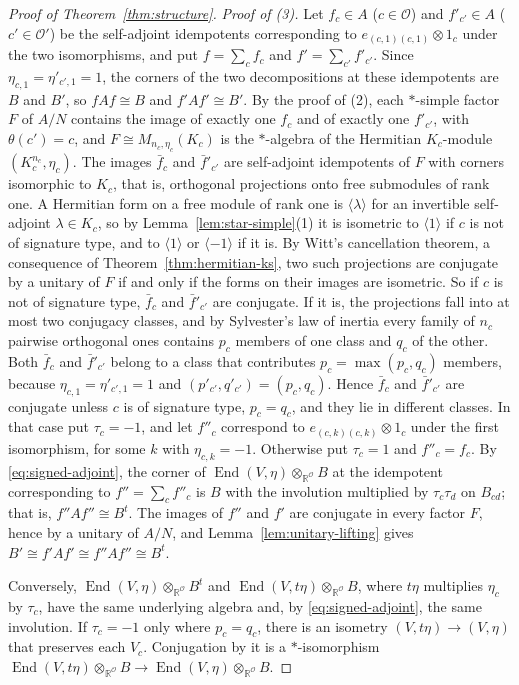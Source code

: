 \documentclass[12pt, a4paper]{report}
\theoremstyle{plain}
\theoremstyle{definition}
\theoremstyle{remark}
\theoremstyle{plain}
\newcommand{\RR}{\mathbb{R}}
\DeclareMathOperator{\End}{End}
\begin{document}
\begin{proof}[Proof of Theorem~\ref{thm:structure}]
\emph{Proof of (3).} Let $f_c\in A$ ($c\in\mathcal O$) and $f'_{c'}\in A$ ($c'\in\mathcal O'$) be the self-adjoint idempotents corresponding to $e_{(c,1)(c,1)}\otimes1_c$ under the two isomorphisms, and put $f=\sum_cf_c$ and $f'=\sum_{c'}f'_{c'}$. Since $\eta_{c,1}=\eta'_{c',1}=1$, the corners of the two decompositions at these idempotents are $B$ and $B'$, so $fAf\cong B$ and $f'Af'\cong B'$. By the proof of (2), each $*$-simple factor $F$ of $A/N$ contains the image of exactly one $f_c$ and of exactly one $f'_{c'}$, with $\theta(c')=c$, and $F\cong M_{n_c,\eta_c}(K_c)$ is the $*$-algebra of the Hermitian $K_c$-module $(K_c^{n_c},\eta_c)$. The images $\bar f_c$ and $\bar f'_{c'}$ are self-adjoint idempotents of $F$ with corners isomorphic to $K_c$, that is, orthogonal projections onto free submodules of rank one. A Hermitian form on a free module of rank one is $\langle\lambda\rangle$ for an invertible self-adjoint $\lambda\in K_c$, so by Lemma~\ref{lem:star-simple}(1) it is isometric to $\langle1\rangle$ if $c$ is not of signature type, and to $\langle1\rangle$ or $\langle-1\rangle$ if it is. By Witt's cancellation theorem, a consequence of Theorem~\ref{thm:hermitian-ks}, two such projections are conjugate by a unitary of $F$ if and only if the forms on their images are isometric. So if $c$ is not of signature type, $\bar f_c$ and $\bar f'_{c'}$ are conjugate. If it is, the projections fall into at most two conjugacy classes, and by Sylvester's law of inertia every family of $n_c$ pairwise orthogonal ones contains $p_c$ members of one class and $q_c$ of the other. Both $\bar f_c$ and $\bar f'_{c'}$ belong to a class that contributes $p_c=\max(p_c,q_c)$ members, because $\eta_{c,1}=\eta'_{c',1}=1$ and $(p'_{c'},q'_{c'})=(p_c,q_c)$. Hence $\bar f_c$ and $\bar f'_{c'}$ are conjugate unless $c$ is of signature type, $p_c=q_c$, and they lie in different classes. In that case put $\tau_c=-1$, and let $f''_c$ correspond to $e_{(c,k)(c,k)}\otimes1_c$ under the first isomorphism, for some $k$ with $\eta_{c,k}=-1$. Otherwise put $\tau_c=1$ and $f''_c=f_c$. By \eqref{eq:signed-adjoint}, the corner of $\End(V,\eta)\otimes_{\RR^{\mathcal O}}B$ at the idempotent corresponding to $f''=\sum_cf''_c$ is $B$ with the involution multiplied by $\tau_c\tau_d$ on $B_{cd}$; that is, $f''Af''\cong B^t$. The images of $f''$ and $f'$ are conjugate in every factor $F$, hence by a unitary of $A/N$, and Lemma~\ref{lem:unitary-lifting} gives $B'\cong f'Af'\cong f''Af''\cong B^t$.

Conversely, $\End(V,\eta)\otimes_{\RR^{\mathcal O}}B^t$ and $\End(V,t\eta)\otimes_{\RR^{\mathcal O}}B$, where $t\eta$ multiplies $\eta_c$ by $\tau_c$, have the same underlying algebra and, by \eqref{eq:signed-adjoint}, the same involution. If $\tau_c=-1$ only where $p_c=q_c$, there is an isometry $(V,t\eta)\to(V,\eta)$ that preserves each $V_c$. Conjugation by it is a $*$-isomorphism $\End(V,t\eta)\otimes_{\RR^{\mathcal O}}B\to\End(V,\eta)\otimes_{\RR^{\mathcal O}}B$.
\end{proof}
\end{document}
